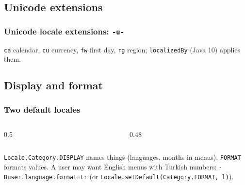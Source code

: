 \documentclass[aspectratio=169,10pt,compress]{beamer}
\begin{document}

\subsection[Extensions]{Unicode extensions}




\begin{frame}[t,fragile] \frametitle{Unicode locale extensions: \texttt{-u-}}

  \vspace{0.1em}
  \small
  \texttt{ca} calendar, \texttt{cu} currency, \texttt{fw} first day, \texttt{rg} region; \texttt{localizedBy} (Java 10) applies them.
\end{frame}

\subsection[Categories]{Display and format}




\begin{frame}[t,fragile] \frametitle{Two default locales}
  \begin{columns}[T]
    \begin{column}{0.5\textwidth}
    \end{column}
    \begin{column}{0.48\textwidth}
    \end{column}
  \end{columns}

  \vspace{0.1em}
  \small \texttt{Locale.Category.DISPLAY} names things (languages, months in menus),
  \texttt{FORMAT} formats values. A user may want English menus with Turkish numbers:
  \texttt{-Duser.language.format=tr} (or \texttt{Locale.setDefault(Category.FORMAT, l)}).
\end{frame}
\end{document}
